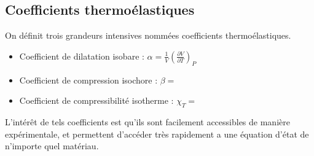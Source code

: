 \subsection{Coefficients thermoélastiques}
\begin{defi}
    On définit trois grandeurs intensives nommées coefficients thermoélastiques.\\
    \begin{itemize}
        \item Coefficient de dilatation isobare : $\alpha = \frac{1}{V}\left(\frac{\partial V}{\partial T}\right)_P$
        \item Coefficient de compression isochore : $\beta = $
        \item Coefficient de compressibilité isotherme : $\chi_T = $
    \end{itemize} 
\end{defi}
L'intérêt de tels coefficients est qu'ils sont facilement accessibles de manière expérimentale,
et permettent d'accéder très rapidement a une équation d'état de n'importe quel matériau.
